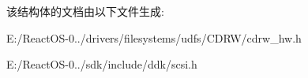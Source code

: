 该结构体的文档由以下文件生成\+:\begin{DoxyCompactItemize}
\item 
E\+:/\+React\+O\+S-\/0../drivers/filesystems/udfs/\+C\+D\+R\+W/cdrw\+\_\+hw.\+h\item 
E\+:/\+React\+O\+S-\/0../sdk/include/ddk/scsi.\+h\end{DoxyCompactItemize}
